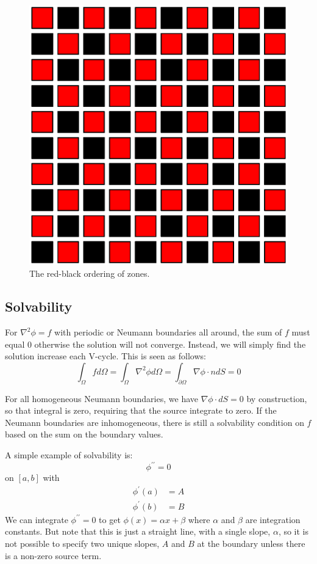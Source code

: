 \begin{figure}[t]
  \centering
  \includegraphics[width=0.6\linewidth]{rb}
  \caption[Red-black ordering of zones]
{\label{fig:rb} The red-black ordering of zones.}
\end{figure}


\subsection{Solvability}

For $\nabla^2 \phi = f$ with periodic or
Neumann boundaries all around, the sum of $f$ must equal $0$
otherwise the solution will not converge.  Instead, we will simply
find the solution increase each V-cycle.  This is seen as follows:
\begin{equation}
  \int_\Omega f d\Omega = \int_\Omega \nabla^2 \phi d\Omega =
  \int_{\partial \Omega} \nabla \phi \cdot n dS = 0
\end{equation}

For all homogeneous Neumann boundaries, we have $\nabla \phi \cdot dS
= 0$ by construction, so that integral is zero, requiring that the
source integrate to zero.  If the Neumann boundaries are inhomogeneous,
there is still a solvability condition on $f$ based on the sum on
the boundary values.

A simple example of solvability is:
\begin{equation}
\phi^{\prime\prime} = 0
\end{equation}
on $[a, b]$ with 
\begin{align}
\phi^\prime(a) &= A \\
\phi^\prime(b) &= B
\end{align}
We can integrate $\phi^{\prime\prime} = 0$ to get $\phi(x) = \alpha x
+ \beta$ where $\alpha$ and $\beta$ are integration constants.  But
note that this is just a straight line, with a single slope, $\alpha$,
so it is not possible to specify two unique slopes, $A$ and $B$ at the
boundary unless there is a non-zero source term.

